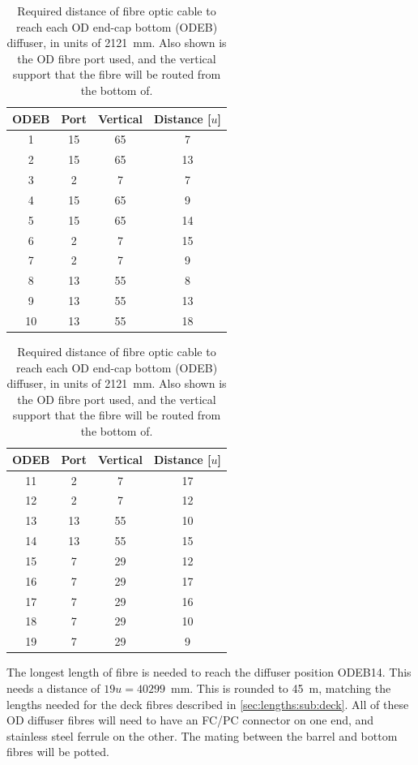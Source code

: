 \documentclass[a4paper,11pt]{article}
\begin{document}
\begin{table}[h!]
\centering
\begin{tabular}[t]{cccc}\toprule
ODEB	&  Port         &	Vertical	&	Distance [$u$]	\\ \midrule
1		&  15           &		65		&	7		\\
2		&  15           &	    65		&	13		\\
3		&	2           &      	7		&	7		\\
4		&  15    		&       65		&	9		\\
5		&  15           &	    65		&	14		\\
6		&	2           &      	7		&	15		\\
7		&	2           &      	7		&	9		\\
8		&	13          &       55		&	8		\\
9		&	13          &      	55		&	13		\\
10		&	13          &	    55		&	18		\\	\bottomrule
\end{tabular}
\hspace{1cm}
\begin{tabular}[t]{cccc}\toprule
ODEB	&	Port        &    Vertical	&	Distance [$u$]	\\ \midrule
11		&	2           &	7		&	17		\\
12		&	2           &	7		&	12		\\
13		&	13          &	55		&	10		\\
14		&	13          &	55		&	15		\\
15		&	7           &	29		&	12		\\
16		&	7           &	29		&	17		\\
17		&	7           &	29		&	16		\\
18		&	7           &	29		&	10		\\
19		&	7           & 	29		&	9		\\	\bottomrule
\end{tabular}
\caption{Required distance of fibre optic cable to reach each OD end-cap bottom (ODEB) diffuser, in units of 2121~mm. Also shown is the OD fibre port used, and the vertical support that the fibre will be routed from the bottom of.}\label{tab:bottomEndCapLen}
\end{table}
The longest length of fibre is needed to reach the diffuser position ODEB14. This needs a distance of $19u = 40299$~mm. This is rounded to 45~m, matching the lengths needed for the deck fibres described in \cref{sec:lengths:sub:deck}. All of these OD diffuser fibres will need to have an FC/PC connector on one end, and stainless steel ferrule on the other. The mating between the barrel and bottom fibres will be potted.
\end{document}
